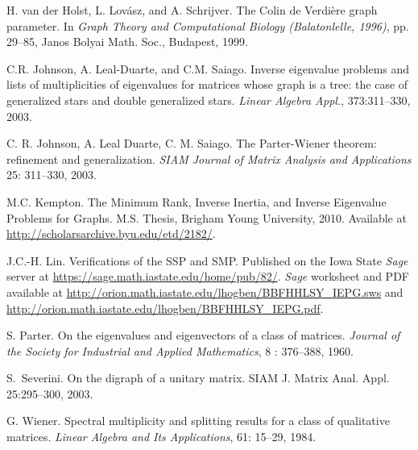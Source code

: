 \documentclass[11pt]{article}
\theoremstyle{definition}
\theoremstyle{definition}
\theoremstyle{definition}
\begin{document}
\begin{thebibliography}{1}
 H. van der Holst, L. Lov\'asz, and A. Schrijver.
 The Colin de Verdi\`ere graph parameter. 
 In {\em Graph Theory and Computational Biology (Balatonlelle, 1996)}, pp. 29--85, 
Janos Bolyai Math. Soc., Budapest, 1999. 

C.R. Johnson, A. Leal-Duarte, and C.M. Saiago. Inverse eigenvalue problems and lists of multiplicities
of eigenvalues for matrices whose graph is a tree: the case of generalized stars and double
generalized stars. {\em Linear Algebra Appl.}, 373:311--330, 2003.

	C. R. Johnson, A. Leal Duarte, C. M. Saiago.
 The Parter-Wiener theorem: refinement and generalization.
 {\em SIAM Journal of Matrix Analysis and Applications} 25: 311--330, 2003. 

M.C. Kempton.
The Minimum Rank, Inverse Inertia, and Inverse Eigenvalue Problems for Graphs.
M.S. Thesis, Brigham Young University, 2010. Available at \url{http://scholarsarchive.byu.edu/etd/2182/}.

  J.C.-H. Lin.  Verifications of the SSP and SMP.  Published on the Iowa State {\em Sage} server at \url{https://sage.math.iastate.edu/home/pub/82/}.
  {\em Sage} worksheet and PDF available at  \url{http://orion.math.iastate.edu/lhogben/BBFHHLSY_IEPG.sws} and  \url{http://orion.math.iastate.edu/lhogben/BBFHHLSY_IEPG.pdf}.
  
 	S. Parter.
 On the eigenvalues and eigenvectors of a class of matrices.
 {\em Journal of the Society for Industrial and Applied Mathematics}, 8 : 376--388, 1960.

 S.~Severini.  On the digraph of a unitary matrix.  SIAM J. Matrix Anal. Appl. {25}:295--300, 2003.

	G. Wiener.
 Spectral multiplicity and splitting results for a class of qualitative matrices.
 {\em Linear Algebra and Its Applications}, 61: 15--29, 1984.

\end{thebibliography}
\end{document}
